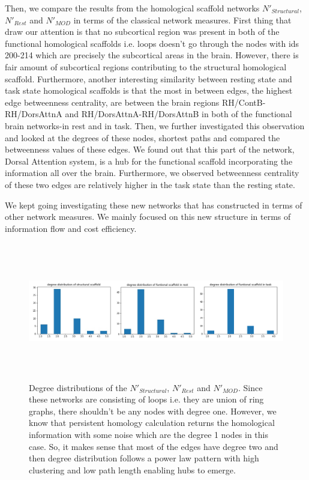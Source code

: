 \documentclass[9pt,twocolumn,twoside,lineno]{pnas-new}
\begin{document}
Then, we compare the results from the homological scaffold networks $N'_{Structural}$, $N'_{Rest}$ and $N'_{MOD}$ in terms of the classical network measures. First thing that draw our attention is that no subcortical region was present in both of the functional homological scaffolds i.e. loops doesn't go through the nodes with ids 200-214 which are precisely the subcortical areas  in the brain. However, there is fair amount of subcortical regions contributing to the structural homological scaffold. Furthermore, another interesting similarity between resting state and task state homological scaffolds is that the most in between edges, the highest edge betweenness centrality, are between the brain regions RH/ContB-RH/DorsAttnA and RH/DorsAttnA-RH/DorsAttnB in both of the functional brain networks-in rest and in task. Then, we further investigated this observation and looked at the degrees of these nodes, shortest paths and compared the betweenness values of these edges. We found out that this part of the network, Dorsal Attention system, is a hub for the functional scaffold incorporating the information all over the brain. Furthermore, we observed betweenness centrality of these two edges are relatively higher in the task state than the resting state.

We kept going investigating these new networks that has constructed in terms of other network measures. We mainly focused on this new structure in terms of information flow and cost efficiency.

\begin{figure}%
\centering
\includegraphics[width=16cm,height=6cm]{degreedists.png}
\caption{Degree distributions of the $N'_{Structural}$, $N'_{Rest}$ and $N'_{MOD}$. Since these networks are consisting of loops i.e. they are union of ring graphs, there shouldn't be any nodes with degree one. However, we know that persistent homology calculation returns the homological information with some noise which are the degree 1 nodes in this case. So, it makes sense that most of the edges have degree two and then degree distribution follows a power law pattern with high clustering and low path length enabling hubs to emerge.}
\end{figure}
\end{document}
